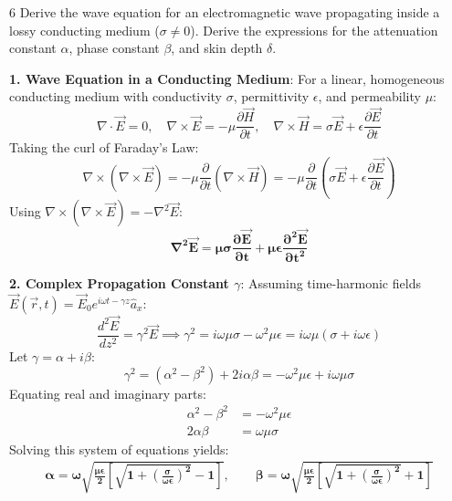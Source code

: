 \begin{theoryq}{6}
Derive the wave equation for an electromagnetic wave propagating inside a lossy conducting medium ($\sigma \ne 0$). Derive the expressions for the attenuation constant $\alpha$, phase constant $\beta$, and skin depth $\delta$.
\end{theoryq}
\begin{theorysol}
\textbf{1. Wave Equation in a Conducting Medium}:
For a linear, homogeneous conducting medium with conductivity $\sigma$, permittivity $\epsilon$, and permeability $\mu$:
\begin{equation}
\nabla \cdot \vec{E} = 0, \quad \nabla \times \vec{E} = -\mu\frac{\partial \vec{H}}{\partial t}, \quad \nabla \times \vec{H} = \sigma\vec{E} + \epsilon\frac{\partial \vec{E}}{\partial t}
\end{equation}
Taking the curl of Faraday's Law:
\begin{equation}
\nabla \times (\nabla \times \vec{E}) = -\mu \frac{\partial}{\partial t}(\nabla \times \vec{H}) = -\mu \frac{\partial}{\partial t}\left(\sigma \vec{E} + \epsilon \frac{\partial \vec{E}}{\partial t}\right)
\end{equation}
Using $\nabla \times (\nabla \times \vec{E}) = -\nabla^2 \vec{E}$:
\begin{equation}
\mathbf{\nabla^2 \vec{E} = \mu \sigma \frac{\partial \vec{E}}{\partial t} + \mu \epsilon \frac{\partial^2 \vec{E}}{\partial t^2}}
\end{equation}

\textbf{2. Complex Propagation Constant $\gamma$}:
Assuming time-harmonic fields $\vec{E}(\vec{r},t) = \vec{E}_0 e^{i\omega t - \gamma z}\hat{a}_x$:
\begin{equation}
\frac{d^2 \vec{E}}{dz^2} = \gamma^2 \vec{E} \implies \gamma^2 = i\omega\mu\sigma - \omega^2\mu\epsilon = i\omega\mu(\sigma + i\omega\epsilon)
\end{equation}
Let $\gamma = \alpha + i\beta$:
\begin{equation}
\gamma^2 = (\alpha^2 - \beta^2) + 2i\alpha\beta = -\omega^2\mu\epsilon + i\omega\mu\sigma
\end{equation}
Equating real and imaginary parts:
\begin{align}
\alpha^2 - \beta^2 &= -\omega^2\mu\epsilon \\
2\alpha\beta &= \omega\mu\sigma
\end{align}
Solving this system of equations yields:
\begin{align}
\mathbf{\alpha = \omega\sqrt{\frac{\mu\epsilon}{2}\left[\sqrt{1 + \left(\frac{\sigma}{\omega\epsilon}\right)^2} - 1\right]}}, \qquad
\mathbf{\beta = \omega\sqrt{\frac{\mu\epsilon}{2}\left[\sqrt{1 + \left(\frac{\sigma}{\omega\epsilon}\right)^2} + 1\right]}}
\end{align}


\end{theorysol}
